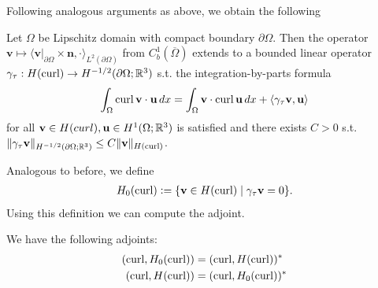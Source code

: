 \documentclass[../main.tex]{subfiles}
\begin{document}
Following analogous arguments as above, we obtain the following 
\begin{theorem}\label{thm:trace_hcurl}
    Let $\Omega$ be Lipschitz domain with compact boundary $\partial \Omega$.
    Then the operator $\mathbf{v} \mapsto 
    \langle \mathbf{v}|_{\partial \Omega} \times \mathbf{n}, \cdot \rangle_{L^2(\partial \Omega)}$ 
    from $C^1_b(\overline{\Omega})$ extends to a bounded linear operator 
    $\gamma_\tau: H(\operatorname{curl}) \rightarrow H^{-1/2}(\partial \Omega; \mathbb{R}^3)$ 
    s.t. the integration-by-parts formula 
    \begin{align*}
        \int_\Omega \operatorname{curl} \mathbf{v} \cdot \mathbf{u} \, dx = 
            \int_\Omega \mathbf{v} \cdot \operatorname{curl} \mathbf{u} \, dx
            + \langle \gamma_\tau \mathbf{v}, \mathbf{u} \rangle
    \end{align*}
    for all $\mathbf{v} \in H(curl), \mathbf{u} \in H^1(\Omega;\mathbb{R}^3)$
    is satisfied and there exists $C>0$ s.t.
    $\lVert \gamma_\tau \mathbf{v} \rVert _{H^{-1/2}(\partial \Omega; \mathbb{R}^3)} 
    \leq C \lVert \mathbf{v} \rVert _{H(\operatorname{curl})}$. 
\end{theorem}
Analogous to before, we define 
\begin{align*}
    H_0(\operatorname{curl}) \vcentcolon= \{ \mathbf{v} \in H(\operatorname{curl}) \mid \gamma_\tau \mathbf{v} = 0\}.
\end{align*}
Using this definition we can compute the adjoint.
\begin{theorem}
    We have the following adjoints:
    \begin{align*}
        (\operatorname{curl}, H_0(\operatorname{curl})) &= (\operatorname{curl}, H(\operatorname{curl}))^* 
        \\ (\operatorname{curl}, H(\operatorname{curl})) &= (\operatorname{curl}, H_0(\operatorname{curl}))^* 
    \end{align*}
\end{theorem}
\end{document}
